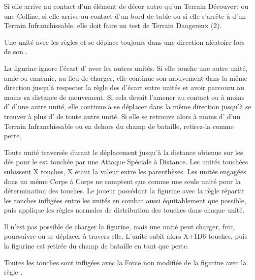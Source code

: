 Si elle arrive au contact d'un élément de décor autre qu'un Terrain Découvert ou une Colline, si elle arrive au contact d'un bord de table ou si elle s'arrête à  d'un Terrain Infranchissable, elle doit faire un test de Terrain Dangereux (2).

\armyspecialruleentry{\runningamok}

Une unité avec les règles \shambolic{} et \runningamok{} se déplace toujours dans une direction aléatoire lors de son \randommovement{}.


La figurine ignore l'écart d' avec les autres unités. Si elle touche une autre unité, amie ou ennemie, au lieu de charger, elle continue son mouvement dans la même direction jusqu'à respecter la règle des  d'écart entre unités et avoir parcouru au moins sa distance de mouvement. Si cela devait l'amener au contact ou à moins d' d'une autre unité, elle continue à se déplacer dans la même direction jusqu'à se trouver à plus d' de toute autre unité. Si elle se retrouve alors à moins d' d'un Terrain Infranchissable ou en dehors du champ de bataille, retirez-la comme perte.

Toute unité traversée durant le déplacement jusqu'à la distance obtenue sur les dés pour le \randommovement{} est touchée par une Attaque Spéciale à Distance. Les unités touchées subissent X touches, X étant la valeur entre les parenthèses. Les unités engagées dans un même Corps à Corps ne comptent que comme une seule unité pour la détermination des touches. Le joueur possédant la figurine avec la règle \ricochet{} répartit les touches infligées entre les unités en combat aussi équitablement que possible, puis applique les règles normales de distribution des touches dans chaque unité.

Il n'est pas possible de charger la figurine, mais une unité peut charger, fuir, poursuivre ou se déplacer à travers elle. L'unité subit alors X+1D6 touches, puis la figurine est retirée du champ de bataille en tant que perte.

Toutes les touches sont infligées avec la Force non modifiée de la figurine avec la règle .

